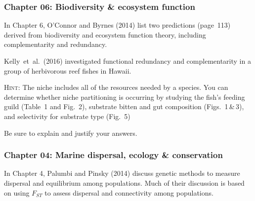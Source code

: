 \documentclass[12pt, addpoints]{exam}
\makeatletter
\DeclareRobustCommand{\amper}{{\amperfont\ifx\f@shape\scname\smaller[1.2]\fi\&}\xspace}
\makeatother
\begin{document}
\begin{questions}
\begin{parts}
\end{parts}


\begin{EnvFullwidth}
\subsubsection*{Chapter 06: Biodiversity \amper ecosystem function}

In Chapter 6, O'Connor and Byrnes (2014) list two predictions (page~113) derived from biodiversity and ecosystem function theory, including complementarity and redundancy.

\end{EnvFullwidth}


\question
Kelly~et~al.~(2016) investigated functional redundancy and complementarity in a group of herbivorous reef fishes in Hawaii.

\textsc{Hint:} The niche includes all of the resources needed by a species. You can determine whether niche partitioning is occurring by studying the fish's feeding guild (Table~1 and Fig.~2), substrate bitten and gut composition (Figs.~1\,\&\,3), and selectivity for substrate type (Fig.~5) 

Be sure to explain and justify your answers.


\begin{EnvFullwidth}
\subsubsection*{Chapter 04: Marine dispersal, ecology \amper conservation}

In Chapter 4, Palumbi and Pinsky (2014) discuss genetic methods to measure dispersal and equilibrium among populations. Much of their discussion is based on using $F_{ST}$ to assess dispersal and connectivity among populations.


\end{EnvFullwidth}
\end{questions}
\end{document}
